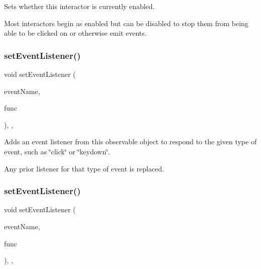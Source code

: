 Sets whether this interactor is currently enabled. 

Most interactors begin as enabled but can be disabled to stop them from being able to be clicked on or otherwise emit events. \mbox{\label{classGObservable_ad2f6d34961c50f6c1e0659990b79f741}} 
\subsubsection{\texorpdfstring{set\+Event\+Listener()}{setEventListener()}\hspace{0.1cm}{\footnotesize\ttfamily [1/2]}}
{\footnotesize\ttfamily void set\+Event\+Listener (\begin{DoxyParamCaption}\item[{const std\+::string \&}]{event\+Name,  }\item[{G\+Event\+Listener}]{func }\end{DoxyParamCaption})\hspace{0.3cm}{\ttfamily [protected]}, {\ttfamily [virtual]}, {\ttfamily [inherited]}}



Adds an event listener from this observable object to respond to the given type of event, such as \char`\"{}click\char`\"{} or \char`\"{}keydown\char`\"{}. 

Any prior listener for that type of event is replaced. \mbox{\label{classGObservable_abac4cb9f9e626e010e87f5d91573c8a5}} 
\subsubsection{\texorpdfstring{set\+Event\+Listener()}{setEventListener()}\hspace{0.1cm}{\footnotesize\ttfamily [2/2]}}
{\footnotesize\ttfamily void set\+Event\+Listener (\begin{DoxyParamCaption}\item[{const std\+::string \&}]{event\+Name,  }\item[{G\+Event\+Listener\+Void}]{func }\end{DoxyParamCaption})\hspace{0.3cm}{\ttfamily [protected]}, {\ttfamily [virtual]}, {\ttfamily [inherited]}}



